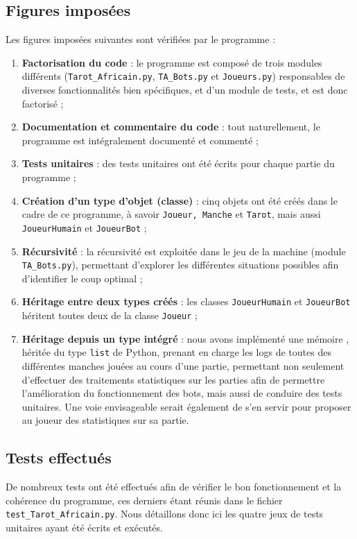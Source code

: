    \subsection{Figures imposées}\label{subsec:figures-imposées}
      Les figures imposées suivantes sont vérifiées par le programme :
      \begin{enumerate}
         \item \textbf{Factorisation du code} : le programme est composé de trois modules différents (\texttt{Tarot\_Africain.py}, \texttt{TA\_Bots.py} et \texttt{Joueurs.py}) responsables de diverses fonctionnalités bien spécifiques, et d'un module de tests, et est donc factorisé ;
         \item \textbf{Documentation et commentaire du code} : tout naturellement, le programme est intégralement documenté et commenté ;
         \item \textbf{Tests unitaires} : des tests unitaires ont été écrits pour chaque partie du programme ;
         \item \textbf{Création d'un type d'objet (classe)} : cinq objets ont été créés dans le cadre de ce programme, à savoir \texttt{Joueur, Manche} et \texttt{Tarot}, mais aussi \texttt{JoueurHumain} et \texttt{JoueurBot} ;
         \item \textbf{Récursivité} : la récursivité est exploitée dans le jeu de la machine (module \texttt{TA\_Bots.py}), permettant d'explorer les différentes situations possibles afin d'identifier le coup optimal ;
         \item \textbf{Héritage entre deux types créés} : les classes \texttt{JoueurHumain} et \texttt{JoueurBot} héritent toutes deux de la classe \texttt{Joueur} ;
         \item \textbf{Héritage depuis un type intégré} : nous avons implémenté une \og mémoire \fg{}, héritée du type \texttt{list} de Python, prenant en charge les logs de toutes des différentes manches jouées au cours d'une partie, permettant non seulement d'effectuer des traitements statistiques sur les parties afin de permettre l'amélioration du fonctionnement des bots, mais aussi de conduire des tests unitaires.
         Une voie envisageable serait également de s'en servir pour proposer au joueur des statistiques sur sa partie.
      \end{enumerate}

   \subsection{Tests effectués}\label{subsec:tests-effectués}
      De nombreux tests ont été effectués afin de vérifier le bon fonctionnement et la cohérence du programme, ces derniers étant réunis dans le fichier \texttt{test\_Tarot\_Africain.py}.
      Nous détaillons donc ici les quatre jeux de tests unitaires ayant été écrits et exécutés.

